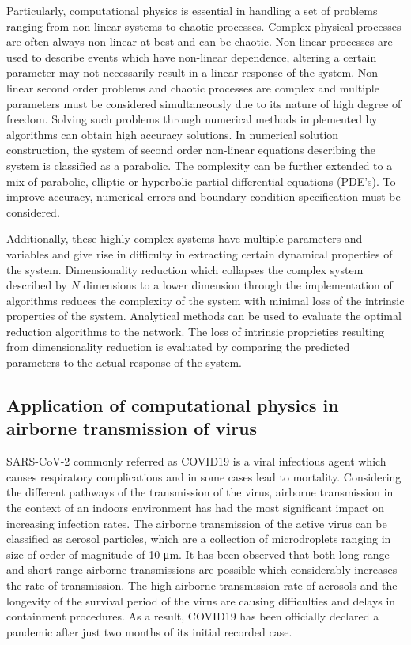 \documentclass[11pt]{report}
\begin{document}
Particularly, computational physics is essential in handling a set of problems ranging from non-linear systems to chaotic processes. Complex physical processes are often always non-linear at best and can be chaotic. Non-linear processes are used to describe events which have non-linear dependence, altering a certain parameter may not necessarily result in a linear response of the system. Non-linear second order problems and chaotic processes are complex and multiple parameters must be considered simultaneously due to its nature of high degree of freedom. Solving such problems through numerical methods implemented by algorithms can obtain high accuracy solutions. In numerical solution construction, the system of  second order non-linear equations describing the system is classified as a parabolic. The complexity can be further extended to a mix of parabolic, elliptic or hyperbolic partial differential equations (PDE's). To improve accuracy, numerical errors and boundary condition specification must be considered.

Additionally, these highly complex systems have multiple parameters and variables and give rise in difficulty in extracting certain dynamical properties of the system. Dimensionality reduction which  collapses the complex system described by $N$ dimensions to a lower dimension through the implementation of algorithms reduces the complexity of the system with minimal loss of the intrinsic properties of the system. Analytical methods can be used to evaluate the optimal reduction algorithms to the network. The loss of intrinsic proprieties resulting from dimensionality reduction is evaluated by comparing the predicted parameters to the actual response of the system. 


\subsection{Application of computational physics in airborne transmission of virus}

SARS-CoV-2 commonly referred as COVID19 is a viral infectious agent which causes respiratory complications and in some cases lead to mortality. Considering the different pathways of the transmission of the virus, airborne transmission in the context of an indoors environment has had the most significant impact on increasing infection rates. The airborne transmission of the active virus can be classified as aerosol particles, which are a collection of microdroplets ranging in size of order of magnitude of 10 \si{\micro\meter}. It has been observed that both long-range and short-range airborne transmissions are possible which considerably increases the rate of transmission. The high airborne transmission rate of aerosols and the longevity of the survival period of the virus are causing difficulties and delays in containment procedures. As a result, COVID19 has been officially declared a pandemic after just two months of its initial recorded case.
\end{document}
